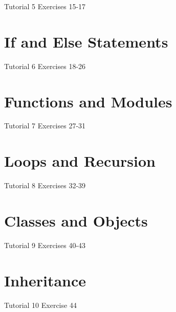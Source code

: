 \documentclass[12pt,a4paper,article]{memoir} %
\begin{document}
Tutorial 5
Exercises 15-17

\section{If and Else Statements}

Tutorial 6
Exercises 18-26

\section{Functions and Modules}

Tutorial 7
Exercises 27-31

\section{Loops and Recursion}

Tutorial 8
Exercises 32-39

\section{Classes and Objects}

Tutorial 9
Exercises 40-43

\section{Inheritance}

Tutorial 10
Exercise 44
\end{document}
